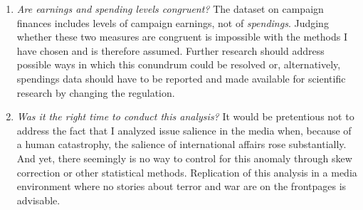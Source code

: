 \documentclass[11pt,a4paper]{article}
\begin{document}
\begin{enumerate}
    \item \textit{Are earnings and spending levels congruent?} The dataset on campaign finances includes levels of campaign earnings, not of \textit{spendings}. Judging whether these two measures are congruent is impossible with the methods I have chosen and is therefore assumed. Further research should address possible ways in which this conundrum could be resolved or, alternatively, spendings data should have to be reported and made available for scientific research by changing the regulation.

    \item \textit{Was it the right time to conduct this analysis?} It would be pretentious not to address the fact that I analyzed issue salience in the media when, because of a human catastrophy, the salience of international affairs rose substantially. And yet, there seemingly is no way to control for this anomaly through skew correction or other statistical methods. Replication of this analysis in a media environment where no stories about terror and war are on the frontpages is advisable. 



\end{enumerate}
\end{document}
